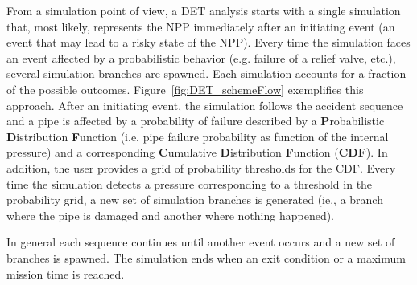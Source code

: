 From a simulation point of view, a DET analysis starts with a single simulation that, most likely, represents the NPP immediately after an initiating event (an event that may lead to a risky state of the NPP). Every time the simulation faces an event affected by a probabilistic behavior (e.g. failure of a relief valve, etc.), several simulation branches are spawned. Each simulation accounts for a fraction of the possible outcomes.
Figure~\ref{fig:DET_schemeFlow} exemplifies this approach. After an initiating event, the simulation follows the accident sequence and a pipe is affected by a probability of failure described by a \textbf{P}robabilistic \textbf{D}istribution \textbf{F}unction (i.e. pipe failure probability as function of the internal pressure) and a corresponding \textbf{C}umulative \textbf{D}istribution \textbf{F}unction (\textbf{CDF}).
In addition, the user provides a grid of probability thresholds for the CDF. Every time the simulation detects a pressure corresponding to a threshold in the probability grid, a new set of simulation branches is generated (ie., a branch  where the pipe is damaged  and another where nothing happened).

In general each sequence continues until another event occurs and a new set of branches is spawned. The simulation ends when an exit condition or a maximum mission time is reached.
